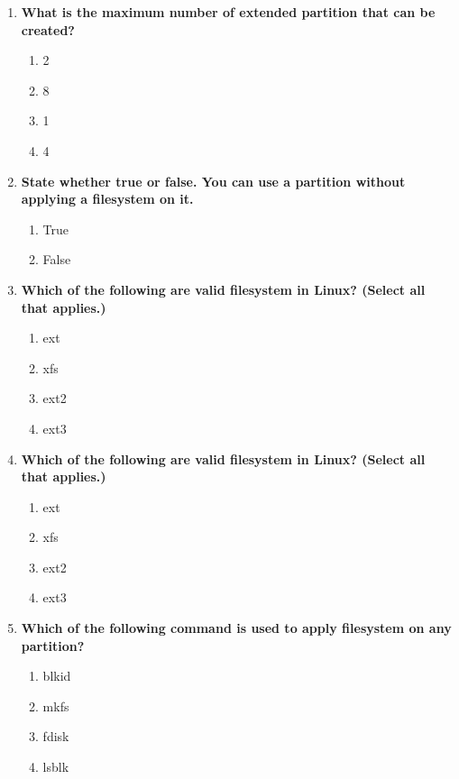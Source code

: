 \begin{flushleft}
\begin{enumerate}
		\item \textbf{What is the maximum number of extended partition that can be created?}
		\begin{enumerate}[label=(\alph*)]
			\item 2
			\item 8
			\item 1  %
			\item 4 
		\end{enumerate}
		\bigskip
		\bigskip	

		\item \textbf{State whether true or false. You can use a partition without applying a filesystem on it.}
		\begin{enumerate}[label=(\alph*)]
			\item True    
			\item False     %
		\end{enumerate}
		\bigskip
		\bigskip
		
		
		\item \textbf{Which of the following are valid filesystem in Linux? (Select all that applies.)}
		\begin{enumerate}[label=(\alph*)]
			\item ext  %
			\item xfs  %
			\item ext2 %
			\item ext3  %
		\end{enumerate}
		\bigskip
		\bigskip	

		\item \textbf{Which of the following are valid filesystem in Linux? (Select all that applies.)}
		\begin{enumerate}[label=(\alph*)]
			\item ext  %
			\item xfs  %
			\item ext2 %
			\item ext3  %
		\end{enumerate}
		\bigskip
		\bigskip	

		\item \textbf{Which of the following command is used to apply filesystem on any partition?}
		\begin{enumerate}[label=(\alph*)]
			\item blkid
			\item mkfs  %
			\item fdisk
			\item lsblk
		\end{enumerate}
		\bigskip
		\bigskip	



\end{enumerate}
\end{flushleft}
